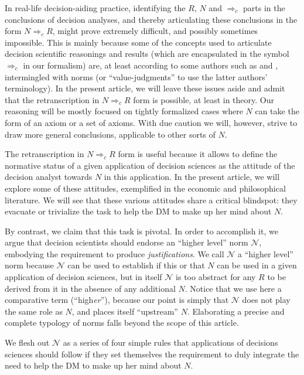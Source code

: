 \documentclass[preprint, french, english, 11pt, authoryear]{elsarticle}%
\newcommand{\adv}{\mathscr{N}}
\begin{document}
In real-life decision-aiding practice, identifying the $R$, $N$ and $⇒_c$ parts in the conclusions of decision analyses, and thereby articulating these conclusions in the form $N ⇒_c R$, might prove extremely difficult, and possibly sometimes impossible. This is mainly because some of the concepts used to articulate decision scientific reasonings and results (which are encapsulated in the symbol $⇒_c$ in our formalism) are, at least according to some authors such as \citet{mongin_value_2006} and \citet{baujard_value_2013}, intermingled with norms (or “value-judgments” to use the latter authors' terminology). In the present article, we will leave these issues aside and admit that the retranscription in $N ⇒_c R$ form is possible, at least  in theory. Our reasoning will be mostly focused on tightly formalized cases where $N$ can take the form of an axiom or a set of axioms. With due caution we will, however, strive to draw more general conclusions, applicable to other sorts of $N$.

The retranscription in $N ⇒_c R$ form is useful because it allows to define the normative status of a given application of decision sciences as the attitude of the decision analyst towards $N$ in this application. In the present article, we will explore some of these attitudes, exemplified in the economic and philosophical literature. We will see that these various attitudes share a critical blindspot: they evacuate or trivialize the task to help the \ac{DM} to make up her mind about $N$.

By contrast, we claim that this task is pivotal. In order to accomplish it, we argue that decision scientists should endorse an “higher level” norm $\adv$, embodying the requirement to produce \emph{justifications}. We call $\adv$ a “higher level” norm because $\adv$ can be used to establish if this or that $N$ can be used in a given application of decision sciences, but in itself $\adv$ is too abstract for any $R$ to be derived from it in the absence of any additional $N$. Notice that we use here a comparative term (“high\emph{er}”), because our point is simply that $\adv$ does not play the same role as $N$, and places itself “upstream” $N$. Elaborating a precise and complete typology of norms falls beyond the scope of this article.

We flesh out $\adv$ as a series of four simple rules that applications of decisions sciences should follow if they set themselves the requirement to duly integrate the need to help the \ac{DM} to make up her mind about $N$. 
\end{document}
